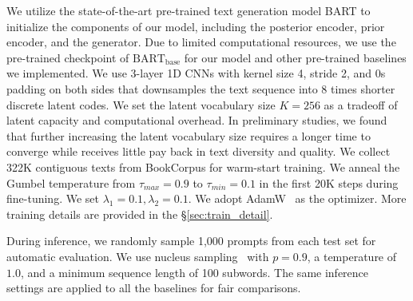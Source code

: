 \documentclass[11pt]{article}
\begin{document}
We utilize the state-of-the-art pre-trained text generation model BART to initialize the components of our model, including the posterior encoder, prior encoder, and the generator. Due to limited computational resources, we use the pre-trained checkpoint of $\text{BART}_{\text{base}}$ for our model and other pre-trained baselines we implemented. We use $3$-layer 1D CNNs with kernel size 4, stride 2, and 0s padding on both sides that downsamples the text sequence into $8$ times shorter discrete latent codes. We set the latent vocabulary size $K=256$ as a tradeoff of latent capacity and computational overhead. In preliminary studies, we found that further increasing the latent vocabulary size requires a longer time to converge while receives little pay back in text diversity and quality. We collect 322K contiguous texts from BookCorpus for warm-start training. We anneal the Gumbel temperature from $\tau_{max}=0.9$ to $\tau_{min}=0.1$ in the first 20K steps during fine-tuning. We set $\lambda_1=0.1, \lambda_2=0.1$. We adopt AdamW~\citep{DBLP:conf/iclr/LoshchilovH19} as the optimizer. More training details are provided in the \S{\ref{sec:train_detail}}.%

During inference, we randomly sample 1,000 prompts from each test set for automatic evaluation. 
We use nucleus sampling~\citep{DBLP:conf/iclr/HoltzmanBDFC20} with $p=0.9$, a temperature of $1.0$, and a minimum sequence length of 100 subwords. The same inference settings are applied to all the baselines for fair comparisons.
\end{document}
